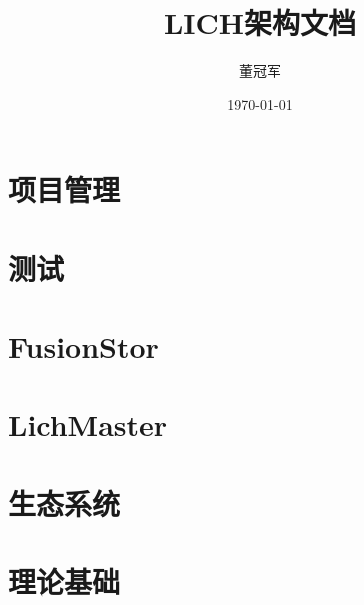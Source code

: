 \documentclass[UTF8,oneside]{ctexbook}
\title{LICH架构文档}
\author{董冠军}
\date{\today}
\begin{document}
\maketitle
\tableofcontents

\listoftodos[Notes]

\part{项目管理}





\part{测试}



\part{FusionStor}




% 









% 








% 
% 

\part{LichMaster}


\part{生态系统}





%
%
%

\part{理论基础}
\end{document}
